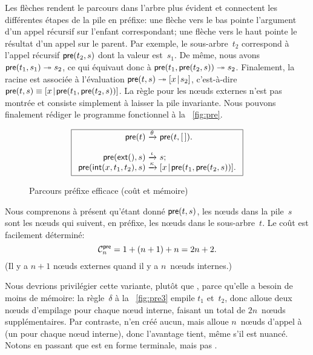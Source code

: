 Les flèches rendent le parcours dans l'arbre plus évident et
connectent les différentes étapes de la pile en préfixe: une flèche
vers le bas pointe l'argument d'un appel récursif sur l'enfant
correspondant; une flèche vers le haut pointe le résultat d'un appel
sur le parent. Par exemple, le sous-arbre~\(t_2\) correspond à l'appel
récursif \(\textsf{pre}(t_2,s)\) dont la valeur
est~\(s_1\).  De même, nous avons \(\textsf{pre}(t_1,s_1)
\twoheadrightarrow s_2\), ce qui équivaut donc à
\(\textsf{pre}(t_1,\textsf{pre}(t_2,s)) \twoheadrightarrow
s_2\). Finalement, la racine est associée à l'évaluation
\(\textsf{pre}(t,s) \twoheadrightarrow [{x}\!\mid\!{s_2}]\), c'est-à-dire
\(\textsf{pre}(t,s) \equiv
[{x}\!\mid\!{\textsf{pre}(t_1,\textsf{pre}(t_2,s))}]\). La
règle pour les n{\oe}uds externes n'est pas montrée et consiste
simplement à laisser la pile invariante. Nous pouvons finalement
rédiger le programme fonctionnel à la \fig~\vref{fig:pre}.
\begin{figure}[b]
\begin{equation*}
\boxed{
\begin{array}{r@{\;}c@{\;}l}
\fun{pre}(t) & \xrightarrow{\smash{\theta}} & \fun{pre}(t,\el).\\
\\
\fun{pre}(\fun{ext}(),s) & \xrightarrow{\smash{\iota}} & s;\\
\fun{pre}(\fun{int}(x,t_1,t_2),s)
  & \xrightarrow{\smash{\kappa}}
  & \cons{x}{\fun{pre}(t_1,\fun{pre}(t_2,s))}.
\end{array}}
\end{equation*}
\caption{Parcours préfixe efficace (coût et mémoire)\label{fig:pre}}
\end{figure}
Nous comprenons à présent qu'étant donné \(\textsf{pre}(t,s)\), les
n{\oe}uds dans la pile~\(s\) sont les n{\oe}uds qui suivent, en
préfixe, les n{\oe}uds dans le sous-arbre~\(t\). Le coût est
facilement déterminé:
\begin{equation}
\C{\fun{pre}}{n} = 1 + (n+1) + n = 2n+2.\label{eq_pre}
\index{pre@$\C{\fun{pre}}{n}$}
\end{equation}
(Il y a \(n+1\) n{\oe}uds externes quand il y a \(n\)~n{\oe}uds
internes.)

Nous devrions privilégier cette variante, plutôt que
, parce qu'elle a
besoin de moins de mémoire: la règle~\(\delta\) à la
\fig~\vref{fig:pre3} empile \(t_1\) et~\(t_2\), donc alloue deux
n{\oe}uds d'empilage pour chaque n{\oe}ud
interne, faisant un total de \(2n\)~n{\oe}uds supplémentaires. Par
contraste,  n'en créé aucun, mais
alloue \(n\)~n{\oe}uds d'appel à 
(un pour chaque n{\oe}ud interne), donc l'avantage tient, même s'il
est nuancé. Notons en passant que
 est en forme
terminale, mais pas
.

